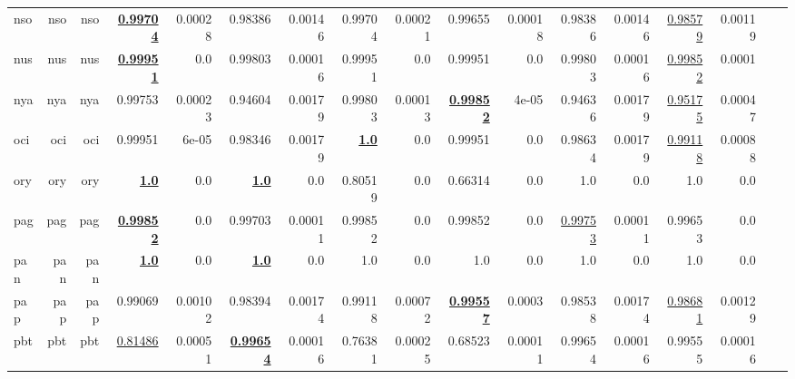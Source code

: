 \documentclass[11pt]{article}
\begin{document}
\begin{table*}[h]
{\begin{tabular}{lrrrrrrrrrrrrrrrr}
nso         & nso         & nso         & \textbf{\underline{0.99704}}         & 0.00028         & 0.98386         & 0.00146         & 0.99704         & 0.00021         & 0.99655         & 0.00018         & 0.98386         & 0.00146         & \underline{0.98579}         & 0.00119         \\
nus         & nus         & nus         & \textbf{\underline{0.99951}}         & 0.0         & 0.99803         & 0.00016         & 0.99951         & 0.0         & 0.99951         & 0.0         & 0.99803         & 0.00016         & \underline{0.99852}         & 0.0001         \\
nya         & nya         & nya         & 0.99753         & 0.00023         & 0.94604         & 0.00179         & 0.99803         & 0.00013         & \textbf{\underline{0.99852}}         & 4e-05         & 0.94636         & 0.00179         & \underline{0.95175}         & 0.00047         \\
oci         & oci         & oci         & 0.99951         & 6e-05         & 0.98346         & 0.00179         & \textbf{\underline{1.0}}         & 0.0         & 0.99951         & 0.0         & 0.98634         & 0.00179         & \underline{0.99118}         & 0.00088         \\
ory         & ory         & ory         & \textbf{\underline{1.0}}         & 0.0         & \textbf{\underline{1.0}}         & 0.0         & 0.80519         & 0.0         & 0.66314         & 0.0         & 1.0         & 0.0         & 1.0         & 0.0         \\
pag         & pag         & pag         & \textbf{\underline{0.99852}}         & 0.0         & 0.99703         & 0.00011         & 0.99852         & 0.0         & 0.99852         & 0.0         & \underline{0.99753}         & 0.00011         & 0.99653         & 0.0         \\
pan         & pan         & pan         & \textbf{\underline{1.0}}         & 0.0         & \textbf{\underline{1.0}}         & 0.0         & 1.0         & 0.0         & 1.0         & 0.0         & 1.0         & 0.0         & 1.0         & 0.0         \\
pap         & pap         & pap         & 0.99069         & 0.00102         & 0.98394         & 0.00174         & 0.99118         & 0.00072         & \textbf{\underline{0.99557}}         & 0.0003         & 0.98538         & 0.00174         & \underline{0.98681}         & 0.00129         \\
pbt         & pbt         & pbt         & \underline{0.81486}         & 0.00051         & \textbf{\underline{0.99654}}         & 0.00016         & 0.76381         & 0.00025         & 0.68523         & 0.00011         & 0.99654         & 0.00016         & 0.99555         & 0.00016         \\

\end{tabular}}
\end{table*}
\end{document}
